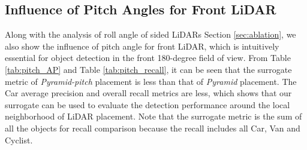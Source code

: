 \documentclass[10pt,twocolumn,letterpaper]{article}
\newcommand{\todo}[1]{\hl{[#1]}}
\begin{document}
\begin{table}[]
\centering
{}
\caption{Influence of pitch rotation of front LiDARs on overall recall detection performance.
}
\label{tab:pitch_recall}
\vspace*{-5mm}
\end{table}

\subsection{Influence of Pitch Angles for Front LiDAR}
Along with the analysis of roll angle of sided LiDARs Section \ref{sec:ablation}, we also show the influence of pitch angle for front LiDAR, which is intuitively essential for object detection in the front 180-degree field of view. From Table \ref{tab:pitch_AP} and Table \ref{tab:pitch_recall}, it can be seen that the surrogate metric of \textit{Pyramid-pitch} placement is less than that of \textit{Pyramid} placement. The Car average precision and overall recall metrics are less, which shows that our surrogate can be used to evaluate the detection performance around the local neighborhood of LiDAR placement. Note that the surrogate metric is the sum of all the objects for recall comparison because the recall includes all Car, Van and Cyclist.
\end{document}
